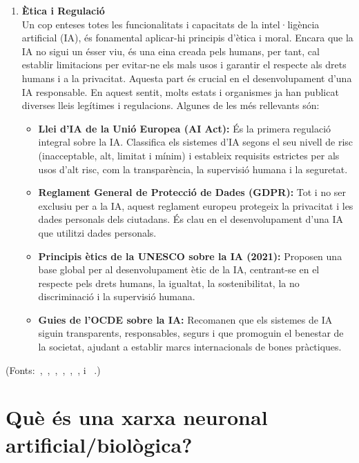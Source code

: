 \begin{enumerate}
    \item \textbf{Ètica i Regulació}\\
    Un cop enteses totes les funcionalitats i capacitats de la intel·ligència artificial (IA), és fonamental aplicar-hi principis d'ètica i moral. Encara que la IA no sigui un ésser viu, és una eina creada pels humans, per tant, cal establir limitacions per evitar-ne els mals usos i garantir el respecte als drets humans i a la privacitat. Aquesta part és crucial en el desenvolupament d'una IA responsable. En aquest sentit, molts estats i organismes ja han publicat diverses lleis legítimes i regulacions. Algunes de les més rellevants són:
    \begin{itemize}
        \item \textbf{Llei d'IA de la Unió Europea (AI Act):} És la primera regulació integral sobre la IA. Classifica els sistemes d'IA segons el seu nivell de risc (inacceptable, alt, limitat i mínim) i estableix requisits estrictes per als usos d'alt risc, com la transparència, la supervisió humana i la seguretat.
        \item \textbf{Reglament General de Protecció de Dades (GDPR):} Tot i no ser exclusiu per a la IA, aquest reglament europeu protegeix la privacitat i les dades personals dels ciutadans. És clau en el desenvolupament d'una IA que utilitzi dades personals.
        \item \textbf{Principis ètics de la UNESCO sobre la IA (2021):} Proposen una base global per al desenvolupament ètic de la IA, centrant-se en el respecte pels drets humans, la igualtat, la sostenibilitat, la no discriminació i la supervisió humana.
        \item \textbf{Guies de l'OCDE sobre la IA:} Recomanen que els sistemes de IA siguin transparents, responsables, segurs i que promoguin el benestar de la societat, ajudant a establir marcs internacionals de bones pràctiques.
    \end{itemize}
\end{enumerate}

(Fonts:~\cite{Universitat_oberta_catalunya},~\cite{Generalitat},~\cite{IBM_machine_learning},~\cite{Ultralytics},~\cite{bengio2012},~\cite{Ai_Act}, \cite{Algoritmes} i ~\cite{Unesco}.)

\section{Què és una xarxa neuronal artificial/biològica?}\label{sec:xarxa neuronal}

